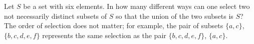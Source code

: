 Let $S$ be a set with six elements.  In how many different ways can one select two not necessarily distinct subsets of $S$ so that the union of the two subsets is $S$?  The order of selection does not matter; for example, the pair of subsets $\{a, c\}$, $\{b, c, d, e, f\}$ represents the same selection as the pair $\{b, c, d, e, f\}$, $\{a, c\}$.